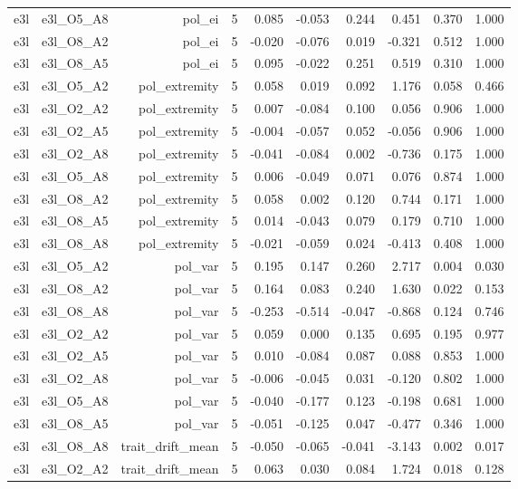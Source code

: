 \documentclass[11pt]{article}
\begin{document}
\begin{landscape}
\begin{longtable}{@{}lrrrrrrrrr@{}}
e3l & e3l\_O5\_A8 & pol\_ei & 5 & 0.085 & -0.053 & 0.244 & 0.451 & 0.370 & 1.000 \\
e3l & e3l\_O8\_A2 & pol\_ei & 5 & -0.020 & -0.076 & 0.019 & -0.321 & 0.512 & 1.000 \\
e3l & e3l\_O8\_A5 & pol\_ei & 5 & 0.095 & -0.022 & 0.251 & 0.519 & 0.310 & 1.000 \\
e3l & e3l\_O5\_A2 & pol\_extremity & 5 & 0.058 & 0.019 & 0.092 & 1.176 & 0.058 & 0.466 \\
e3l & e3l\_O2\_A2 & pol\_extremity & 5 & 0.007 & -0.084 & 0.100 & 0.056 & 0.906 & 1.000 \\
e3l & e3l\_O2\_A5 & pol\_extremity & 5 & -0.004 & -0.057 & 0.052 & -0.056 & 0.906 & 1.000 \\
e3l & e3l\_O2\_A8 & pol\_extremity & 5 & -0.041 & -0.084 & 0.002 & -0.736 & 0.175 & 1.000 \\
e3l & e3l\_O5\_A8 & pol\_extremity & 5 & 0.006 & -0.049 & 0.071 & 0.076 & 0.874 & 1.000 \\
e3l & e3l\_O8\_A2 & pol\_extremity & 5 & 0.058 & 0.002 & 0.120 & 0.744 & 0.171 & 1.000 \\
e3l & e3l\_O8\_A5 & pol\_extremity & 5 & 0.014 & -0.043 & 0.079 & 0.179 & 0.710 & 1.000 \\
e3l & e3l\_O8\_A8 & pol\_extremity & 5 & -0.021 & -0.059 & 0.024 & -0.413 & 0.408 & 1.000 \\
e3l & e3l\_O5\_A2 & pol\_var & 5 & 0.195 & 0.147 & 0.260 & 2.717 & 0.004 & 0.030 \\
e3l & e3l\_O8\_A2 & pol\_var & 5 & 0.164 & 0.083 & 0.240 & 1.630 & 0.022 & 0.153 \\
e3l & e3l\_O8\_A8 & pol\_var & 5 & -0.253 & -0.514 & -0.047 & -0.868 & 0.124 & 0.746 \\
e3l & e3l\_O2\_A2 & pol\_var & 5 & 0.059 & 0.000 & 0.135 & 0.695 & 0.195 & 0.977 \\
e3l & e3l\_O2\_A5 & pol\_var & 5 & 0.010 & -0.084 & 0.087 & 0.088 & 0.853 & 1.000 \\
e3l & e3l\_O2\_A8 & pol\_var & 5 & -0.006 & -0.045 & 0.031 & -0.120 & 0.802 & 1.000 \\
e3l & e3l\_O5\_A8 & pol\_var & 5 & -0.040 & -0.177 & 0.123 & -0.198 & 0.681 & 1.000 \\
e3l & e3l\_O8\_A5 & pol\_var & 5 & -0.051 & -0.125 & 0.047 & -0.477 & 0.346 & 1.000 \\
e3l & e3l\_O8\_A8 & trait\_drift\_mean & 5 & -0.050 & -0.065 & -0.041 & -3.143 & 0.002 & 0.017 \\
e3l & e3l\_O2\_A2 & trait\_drift\_mean & 5 & 0.063 & 0.030 & 0.084 & 1.724 & 0.018 & 0.128 \\

\end{longtable}
\end{landscape}
\end{document}
